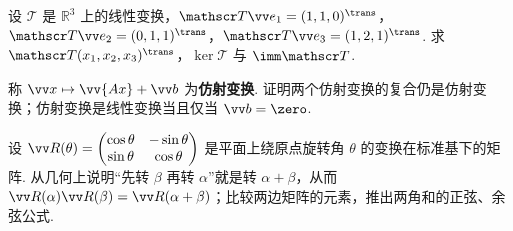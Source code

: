 {\begin{exA}
			\item\label{ex:lmap:A30} 设 $\mathscr T$ 是 $\mathbb{R}^3$ 上的线性变换，$\mathscr T\vv e_1=(1,1,0)^\trans$，$\mathscr T\vv e_2=(0,1,1)^\trans$，$\mathscr T\vv e_3=(1,2,1)^\trans$. 求 $\mathscr T(x_1,x_2,x_3)^\trans$，$\ker\mathscr T$ 与 $\imm\mathscr T$.
			\item\label{ex:lmap:A31} 称 $\vv x\mapsto\vv{Ax}+\vv b$ 为\textbf{仿射变换}. 证明两个仿射变换的复合仍是仿射变换；仿射变换是线性变换当且仅当 $\vv b=\zero$.
			\item\label{ex:lmap:A32} 设 $\vv R(\theta)=\begin{pmatrix}\cos\theta&-\sin\theta\\ \sin\theta&\cos\theta\end{pmatrix}$ 是平面上绕原点旋转角 $\theta$ 的变换在标准基下的矩阵. 从几何上说明“先转 $\beta$ 再转 $\alpha$”就是转 $\alpha+\beta$，从而 $\vv R(\alpha)\vv R(\beta)=\vv R(\alpha+\beta)$；比较两边矩阵的元素，推出两角和的正弦、余弦公式.
		\end{exA}
		
}
